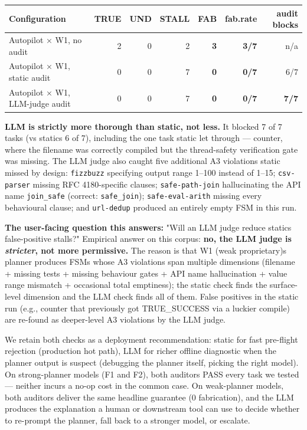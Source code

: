 \begin{longtable}[]{@{}lrrrrrr@{}}
\toprule\noalign{}
Configuration & TRUE & UND & STALL & FAB & fab.rate & audit blocks \\
\midrule\noalign{}
\endhead
\bottomrule\noalign{}
\endlastfoot
Autopilot × W1, no audit & 2 & 0 & 2 & \textbf{3} & \textbf{3/7} & n/a \\
Autopilot × W1, static audit & 0 & 0 & 7 & \textbf{0} & \textbf{0/7} & 6/7 \\
Autopilot × W1, LLM-judge audit & 0 & 0 & 7 & \textbf{0} & \textbf{0/7} & \textbf{7/7} \\
\end{longtable}

\textbf{LLM is strictly more thorough than static, not less.} It blocked 7 of 7 tasks (vs static\textquotesingle s
6 of 7), including the one task static let through --- counter, where the filename was
correctly compiled but the thread-safety verification gate was missing. The LLM judge also
caught five additional A3 violations static missed by design: \texttt{fizzbuzz} specifying output
range 1--100 instead of 1--15; \texttt{csv-parser} missing RFC 4180-specific clauses; \texttt{safe-path-join}
hallucinating the API name \texttt{join\_safe} (correct: \texttt{safe\_join}); \texttt{safe-eval-arith} missing
every behavioural clause; and \texttt{url-dedup} produced an entirely empty FSM in this run.

\textbf{The user-facing question this answers:} "Will an LLM judge reduce static\textquotesingle s false-positive
stalls?" Empirical answer on this corpus: \textbf{no, the LLM judge is \emph{stricter}, not more
permissive.} The reason is that W1 (weak proprietary)\textquotesingle s planner produces FSMs whose A3 violations
span multiple dimensions (filename + missing tests + missing behaviour gates + API name
hallucination + value range mismatch + occasional total emptiness); the static check finds
the surface-level dimension and the LLM check finds all of them. False positives in the
static run (e.g., counter that previously got TRUE\_SUCCESS via a luckier compile) are
re-found as deeper-level A3 violations by the LLM judge.

We retain both checks as a deployment recommendation: static for fast pre-flight rejection
(production hot path), LLM for richer offline diagnostic when the planner output is suspect
(debugging the planner itself, picking the right model). On strong-planner models (F1
and F2), both auditors PASS every task we tested --- neither incurs a no-op cost in the
common case. On weak-planner models, both auditors deliver the same headline guarantee
(0 fabrication), and the LLM produces the explanation a human or downstream tool can use to
decide whether to re-prompt the planner, fall back to a stronger model, or escalate.



